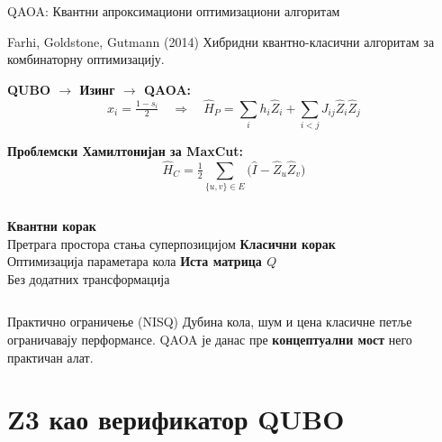 \documentclass[aspectratio=169]{beamer}
\begin{document}
\begin{frame}{QAOA: Квантни апроксимациони оптимизациони алгоритам}
  \begin{block}{Farhi, Goldstone, Gutmann (2014)}
    Хибридни квантно-класични алгоритам за комбинаторну оптимизацију.
  \end{block}

  \medskip
  \textbf{QUBO $\to$ Изинг $\to$ QAOA:}
  \[
    x_i = \tfrac{1-s_i}{2} \quad\Rightarrow\quad
    \hat{H}_P = \sum_i h_i \hat{Z}_i + \sum_{i<j} J_{ij}\hat{Z}_i\hat{Z}_j
  \]

  \medskip
  \textbf{Проблемски Хамилтонијан за MaxCut:}
  \[
    \hat{H}_C = \tfrac{1}{2}\sum_{\{u,v\}\in E}\bigl(\hat{I} - \hat{Z}_u\hat{Z}_v\bigr)
  \]

  \begin{columns}[T]
      \small \textbf{Квантни корак}\\
      Претрага простора стања суперпозицијом
      \small \textbf{Класични корак}\\
      Оптимизација параметара кола
      \small \textbf{Иста матрица $Q$}\\
      Без додатних трансформација
  \end{columns}

  \medskip
  \begin{alertblock}{Практично ограничење (NISQ)}
    Дубина кола, шум и цена класичне петље ограничавају перформансе.
    QAOA је данас пре \textbf{концептуални мост} него практичан алат.
  \end{alertblock}
\end{frame}

\section{Z3 као верификатор QUBO}
\end{document}
